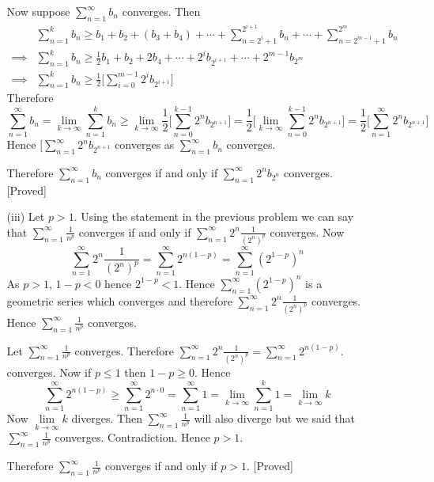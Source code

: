 \documentclass{article}
\begin{document}
\begin{enumerate}
\begin{enumerate}
\hspace{1cm}Now suppose $\sum\limits_{n=1}^{\infty}b_{n}$ converges. Then\begin{align*}
	& \sum\limits_{n=1}^kb_n\geq  b_1+b_2+(b_3+b_4)+\cdots+\sum\limits_{n=2^i+1}^{2^{i+1}}b_n+\cdots +\sum\limits_{n=2^{m-1}+1}^{2^{m}}b_n\\
	\implies & \sum\limits_{n=1}^kb_n\geq \frac{1}{2}b_1+b_2+2b_4+\cdots+2^{i}b_{2^{i+1}}+\cdots+2^{m-1}b_{2^m}\\
	\implies &  \sum\limits_{n=1}^kb_n\geq \frac12\Bigg[\sum\limits_{i=0}^{m-1}2^{i}b_{2^{i+1}}\Bigg]
\end{align*}Therefore$$\sum\limits_{n=1}^{\infty}b_n=\lim\limits_{k\to\infty}\sum\limits_{n=1}^kb_n\geq \lim\limits_{k\to\infty}\frac12\Bigg[\sum\limits_{n=0}^{k-1}2^{n}b_{2^{n+1}}\Bigg]=\frac12\Bigg[\lim\limits_{k\to\infty}\sum\limits_{n=0}^{k-1}2^{n}b_{2^{n+1}}\Bigg]=\frac12\Bigg[\sum\limits_{n=1}^{\infty}2^{n}b_{2^{n+1}}\Bigg]$$Hence $\Bigg[\sum\limits_{n=1}^{\infty}2^{n}b_{2^{n+1}}$ converges  as  $\sum\limits_{n=1}^{\infty}b_n$ converges.

\hspace{1cm}Therefore $\sum\limits_{n=1}^{\infty}b_n$ converges  if and only if  $\sum\limits_{n=1}^{\infty}2^nb_{2^n}$ converges. [Proved]
\item[(iii)] Let $p>1$. Using the statement in the previous problem we can say that $\sum\limits_{n=1}^{\infty}\frac{1}{n^p}$ converges if and only if $\sum\limits_{n=1}^{\infty}2^n\frac{1}{(2^n)^p}$ converges. Now $$\sum\limits_{n=1}^{\infty}2^n\frac{1}{(2^n)^p}=\sum\limits_{n=1}^{\infty}2^{n(1-p)}=\sum\limits_{n=1}^{\infty}(2^{1-p})^n$$As $p>1$, $1-p<0$ hence $2^{1-p}<1$. Hence $\sum\limits_{n=1}^{\infty}(2^{1-p})^n$ is a geometric series which converges and therefore $\sum\limits_{n=1}^{\infty}2^n\frac{1}{(2^n)^p}$ converges. Hence $\sum\limits_{n=1}^{\infty}\frac{1}{n^p}$ converges.

\hspace{1cm}Let $\sum\limits_{n=1}^{\infty}\frac{1}{n^p}$ converges. Therefore $\sum\limits_{n=1}^{\infty}2^n\frac{1}{(2^n)^p}=\sum\limits_{n=1}^{\infty}2^{n(1-p)}$.  converges. Now if $p\leq 1$ then $1-p\geq 0$. Hence$$\sum\limits_{n=1}^{\infty}2^{n(1-p)}\geq\sum\limits_{n=1}^{\infty}2^{n\cdot 0}= \sum\limits_{n=1}^{\infty}1=\lim\limits_{k\to\infty}\sum\limits_{n=1}^k1=\lim\limits_{k\to\infty}k$$Now $\lim\limits_{k\to\infty}k$ diverges. Then $\sum\limits_{n=1}^{\infty}\frac{1}{n^p}$ will also diverge but we said that $\sum\limits_{n=1}^{\infty}\frac{1}{n^p}$ converges. Contradiction. Hence $p>1$.

\hspace{1cm} Therefore $\sum\limits_{n=1}^{\infty}\frac{1}{n^p}$ converges if and only if $p>1$. [Proved]
\end{enumerate}
\end{enumerate}
\end{document}
